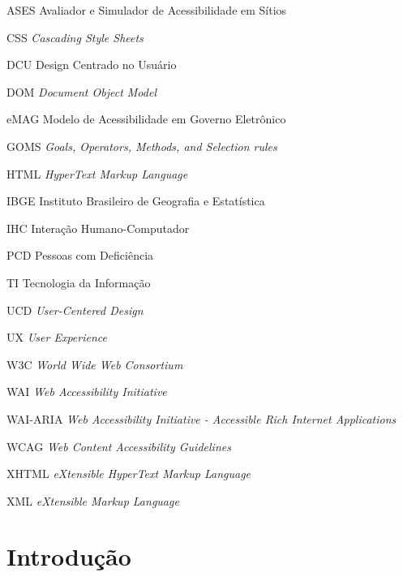 \documentclass[
  12pt,
  openright,
  twoside,
  a4paper,
  english,
  french,
  spanish,
  brazil
]{abntex2}
\begin{document}
\begin{siglas}
  \item[ASES] Avaliador e Simulador de Acessibilidade em Sítios
  \item[CSS] \textit{Cascading Style Sheets}
  \item[DCU] Design Centrado no Usuário
  \item[DOM] \textit{Document Object Model}
  \item[eMAG] Modelo de Acessibilidade em Governo Eletrônico
  \item[GOMS] \textit{Goals, Operators, Methods, and Selection rules}
  \item[HTML] \textit{HyperText Markup Language}
  \item[IBGE] Instituto Brasileiro de Geografia e Estatística
  \item[IHC] Interação Humano-Computador
  \item[PCD] Pessoas com Deficiência
  \item[TI] Tecnologia da Informação
  \item[UCD] \textit{User-Centered Design}
  \item[UX] \textit{User Experience}
  \item[W3C] \textit{World Wide Web Consortium}
  \item[WAI] \textit{Web Accessibility Initiative}
  \item[WAI-ARIA]
    \textit{
      Web Accessibility Initiative - Accessible Rich Internet Applications
    }
  \item[WCAG] \textit{Web Content Accessibility Guidelines}
  \item[XHTML] \textit{eXtensible HyperText Markup Language}
  \item[XML] \textit{eXtensible Markup Language}
\end{siglas}

\tableofcontents*
\cleardoublepage

\textual

\chapter{Introdução}
\end{document}
